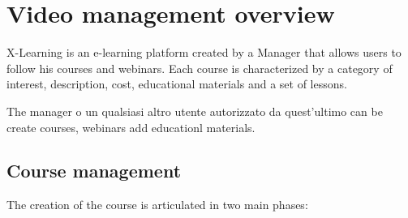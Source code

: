 \section{Video management overview}
\label{sec:Video_management_overview}

X-Learning is an e-learning platform created by a Manager that allows users to follow his courses and webinars.
Each course is characterized by a category of interest, description, cost, educational materials and a set of lessons.

The manager o un qualsiasi altro utente autorizzato da quest'ultimo can be create courses, webinars add educationl materials.

\subsection{Course management}
\label{sec:course_management}

The creation of the course is articulated in two main phases:

